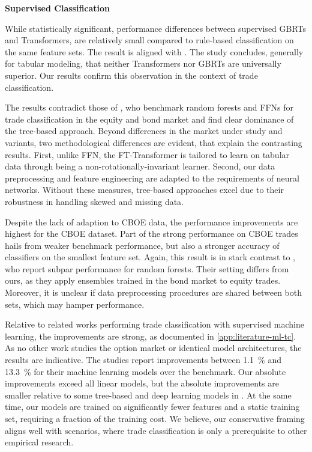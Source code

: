 
\textbf{Supervised Classification}

While statistically significant, performance differences between supervised \glspl{GBRT} and Transformers, are relatively small compared to rule-based classification on the same feature sets. The result is aligned with \textcite[][18941]{gorishniyRevisitingDeepLearning2021}. The study concludes, generally for tabular modeling, that neither Transformers nor \glspl{GBRT} are universally superior. Our results confirm this observation in the context of trade classification.

The results contradict those of \textcite[][14--49]{ronenMachineLearningTrade2022}, who benchmark random forests and \glspl{FFN} for trade classification in the equity and bond market and find clear dominance of the tree-based approach. Beyond differences in the market under study and variants, two methodological differences are evident, that explain the contrasting results. First, unlike \gls{FFN}, the FT-Transformer is tailored to learn on tabular data through being a non-rotationally-invariant learner. Second, our data preprocessing and feature engineering are adapted to the requirements of neural networks. Without these measures, tree-based approaches excel due to their robustness in handling skewed and missing data.

Despite the lack of adaption to \gls{CBOE} data, the performance improvements are highest for the \gls{CBOE} dataset. Part of the strong performance on \gls{CBOE} trades hails from weaker benchmark performance, but also a stronger accuracy of classifiers on the smallest feature set. Again, this result is in stark contrast to \textcite[][32]{ronenMachineLearningTrade2022}, who report subpar performance for random forests. Their setting differs from ours, as they apply ensembles trained in the bond market to equity trades. Moreover, it is unclear if data preprocessing procedures are shared between both sets, which may hamper performance. 

Relative to related works performing trade classification with supervised machine learning, the improvements are strong, as documented in \cref{app:literature-ml-tc}. As no other work studies the option market or identical model architectures, the results are indicative. The studies report improvements between \SI{1.1}{\percent} and \SI{13.3}{\percent} for their machine learning models over the benchmark. Our absolute improvements exceed all linear models, but the absolute improvements are smaller relative to some tree-based and deep learning models in \textcite[][49]{ronenMachineLearningTrade2022}. At the same time, our models are trained on significantly fewer features and a static training set, requiring a fraction of the training cost. We believe, our conservative framing aligns well with scenarios, where trade classification is only a prerequisite to other empirical research.

